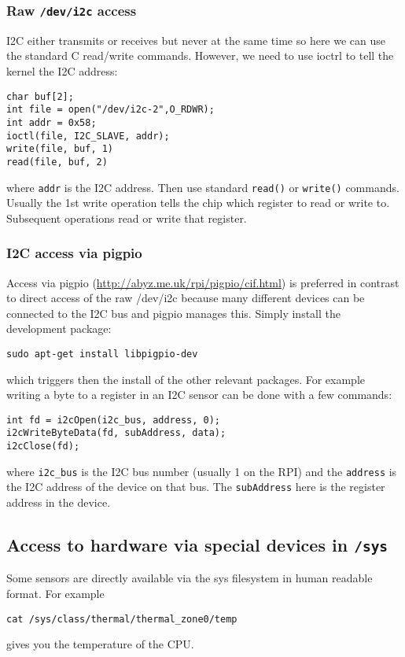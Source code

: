 \documentclass[12pt]{report}
\begin{document}
\subsubsection{Raw \texttt{/dev/i2c} access}
I2C either transmits or receives but never at the same time so here we
can use the standard C read/write commands. However, we need to use ioctrl to tell
the kernel the I2C address:
\begin{verbatim}
char buf[2];
int file = open("/dev/i2c-2",O_RDWR);
int addr = 0x58;
ioctl(file, I2C_SLAVE, addr);
write(file, buf, 1)
read(file, buf, 2)
\end{verbatim}
where \texttt{addr} is the I2C address. Then use standard \texttt{read()}
or \texttt{write()} commands. Usually the 1st write operation tells the chip
which register to read or write to. Subsequent operations read
or write that register.

\subsubsection{I2C access via pigpio}
Access via pigpio (\url{http://abyz.me.uk/rpi/pigpio/cif.html})
is preferred in contrast to direct
access of the raw /dev/i2c because many different devices
can be connected to the I2C bus and pigpio manages this.
Simply install the development package:
\begin{verbatim}
sudo apt-get install libpigpio-dev
\end{verbatim}
which triggers then the install of the other relevant packages.
For example writing a byte to a register in an I2C sensor can be done with a
few commands:
\begin{verbatim}
int fd = i2cOpen(i2c_bus, address, 0);
i2cWriteByteData(fd, subAddress, data);
i2cClose(fd);
\end{verbatim}
where \texttt{i2c\_bus} is the I2C bus number (usually 1 on the RPI)
and the \texttt{address} is the I2C address of the device on that bus.
The \texttt{subAddress} here is the register address in the device.

\subsection{Access to hardware via special devices in \texttt{/sys}}
Some sensors are directly available via the sys filesystem in human readable format.
For example
\begin{verbatim}
cat /sys/class/thermal/thermal_zone0/temp
\end{verbatim}
gives you the temperature of the CPU.
\end{document}
